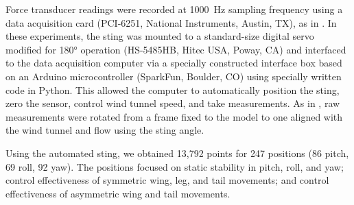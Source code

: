 Force transducer readings were recorded at \SI{1000}{\hertz} sampling frequency using a data acquisition card (PCI-6251, National Instruments, Austin, TX), as in \cite{plos:part1}.  In these experiments, the sting was mounted to a standard-size digital servo modified for \ang{180} operation (HS-5485HB, Hitec USA, Poway, CA) and interfaced to the data acquisition computer via a specially constructed interface box based on an Arduino microcontroller (SparkFun, Boulder, CO) using specially written code in Python.  This allowed the computer to automatically position the sting, zero the sensor, control wind tunnel speed, and take measurements.  As in \cite{plos:part1}, raw measurements were rotated from a frame fixed to the model to one aligned with the wind tunnel and flow using the sting angle. 

Using the automated sting, we obtained 13,792 points for 247 positions (86 pitch, 69 roll, 92 yaw).  The positions focused on static stability in pitch, roll, and yaw; control effectiveness of symmetric wing, leg, and tail movements; and control effectiveness of asymmetric wing and tail movements. 



